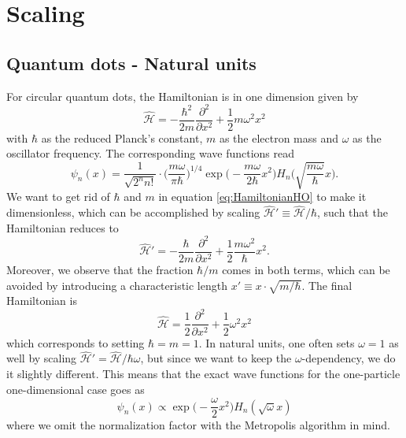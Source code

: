 \chapter{Scaling} \label{app:units}

\section{Quantum dots - Natural units}
For circular quantum dots, the Hamiltonian is in one dimension given by
\begin{equation}
\hat{\mathcal{H}}=-\frac{\hbar^2}{2m}\frac{\partial^2}{\partial x^2}+\frac{1}{2}m\omega^2x^2
\label{eq:HamiltonianHO}
\end{equation}
with $\hbar$ as the reduced Planck's constant, $m$ as the electron mass and $\omega$ as the oscillator frequency. The corresponding wave functions read
\begin{equation}
\psi_n(x)=\frac{1}{\sqrt{2^nn!}}\cdot\bigg(\frac{m\omega}{\pi\hbar}\bigg)^{1/4}\exp\Big(-\frac{m\omega}{2\hbar}x^2\Big)H_n\Big(\sqrt{\frac{m\omega}{\hbar}}x\Big).
\end{equation}
We want to get rid of $\hbar$ and $m$ in equation \eqref{eq:HamiltonianHO} to make it dimensionless, which can be accomplished by scaling  $\hat{\mathcal{H}}'\equiv \hat{\mathcal{H}}/\hbar$, such that the Hamiltonian reduces to
\begin{equation}
\hat{\mathcal{H}}'=-\frac{\hbar}{2m}\frac{\partial^2}{\partial x^2}+\frac{1}{2}\frac{m\omega^2}{\hbar}x^2.
\end{equation}
Moreover, we observe that the fraction $\hbar/m$ comes in both terms, which can be avoided by introducing a characteristic length $x'\equiv x\cdot\sqrt{m/\hbar}$. The final Hamiltonian is
\begin{equation}
\hat{\mathcal{H}}=\frac{1}{2}\frac{\partial^2}{\partial x^2}+\frac{1}{2}\omega^2x^2
\end{equation}
which corresponds to setting $\hbar=m=1$. In natural units, one often sets $\omega=1$ as well by scaling $\hat{\mathcal{H}}'=\hat{\mathcal{H}}/\hbar\omega$, but since we want to keep the $\omega$-dependency, we do it slightly different. This means that the exact wave functions for the one-particle one-dimensional case goes as
\begin{equation}
\psi_n(x)\propto\exp\Big(-\frac{\omega}{2}x^2\Big)H_n(\sqrt{\omega}x)
\end{equation}
where we omit the normalization factor with the Metropolis algorithm in mind. 

